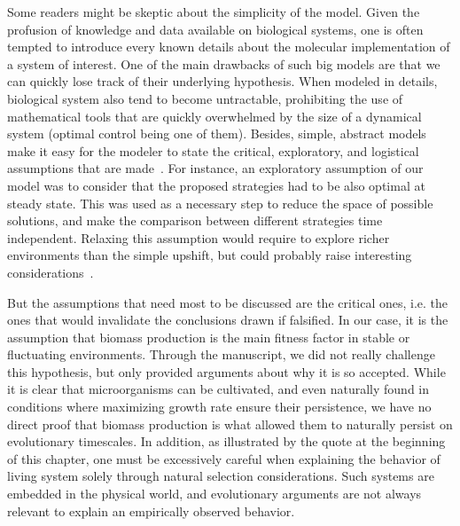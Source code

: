Some readers might be skeptic about the simplicity of the model.
Given the profusion of knowledge and data available on biological systems, one is often tempted to introduce every known details about the molecular implementation of a system of interest.
One of the main drawbacks of such big models are that we can quickly lose track of their underlying hypothesis.
When modeled in details, biological system also tend to become untractable, prohibiting the use of mathematical tools that are quickly overwhelmed by the size of a dynamical system (optimal control being one of them).
Besides, simple, abstract models make it easy for the modeler to state the critical, exploratory, and logistical assumptions that are made~\cite{servedio_not_2014}.
For instance, an exploratory assumption of our model was to consider that the proposed strategies had to be also optimal at steady state.
This was used as a necessary step to reduce the space of possible solutions, and make the comparison between different strategies time independent.
Relaxing this assumption would require to explore richer environments than the simple upshift, but could probably raise interesting considerations~\cite{geisel_constitutive_2011,lopez-maury_tuning_2008,lambert_memory_2014,kussell_phenotypic_2005}.

But the assumptions that need most to be discussed are the critical ones, i.e. the ones that would invalidate the conclusions drawn if falsified.
In our case, it is the assumption that biomass production is the main fitness factor in stable or fluctuating environments.
Through the manuscript, we did not really challenge this hypothesis, but only provided arguments about why it is so accepted.
While it is clear that microorganisms can be cultivated, and even naturally found in conditions where maximizing growth rate ensure their persistence, we have no direct proof that biomass production is what allowed them to naturally persist on evolutionary timescales.
In addition, as illustrated by the quote at the beginning of this chapter, one must be excessively careful when explaining the behavior of living system solely through natural selection considerations.
Such systems are embedded in the physical world, and evolutionary arguments are not always relevant to explain an empirically observed behavior.

